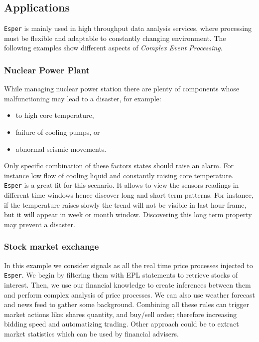 \documentclass[11pt, letterpaper]{article}            %
\begin{document}
\subsection{Applications}
\texttt{Esper} is mainly used in high throughput data analysis services, where processing must be flexible and adaptable to constantly changing environment. The following examples show different aspects of \emph{Complex Event Processing}.

\subsubsection{Nuclear Power Plant}
While managing nuclear power station there are plenty of components whose malfunctioning may lead to a disaster, for example:
\begin{itemize}
\item to high core temperature,
\item failure of cooling pumps, or
\item abnormal seismic movements.
\end{itemize}
Only specific combination of these factors states should raise an alarm. For instance low flow of cooling liquid and constantly raising core temperature.\\
\texttt{Esper} is a great fit for this scenario. It allows to view the sensors readings in different time windows hence discover long and short term patterns. For instance, if the temperature raises slowly the trend will not be visible in last hour frame, but it will appear in week or month window. Discovering this long term property may prevent a disaster.

\subsubsection{Stock market exchange}
In this example we consider signals as all the real time price processes injected to \texttt{Esper}. We begin by filtering them with EPL statements to retrieve stocks of interest. Then, we use our financial knowledge to create inferences between them and perform complex analysis of price processes. We can also use weather forecast and news feed to gather some background. Combining all these rules can trigger market actions like: shares quantity, and buy/sell order; therefore increasing bidding speed and automatizing trading. Other approach could be to extract market statistics which can be used by financial advisers.
\end{document}
